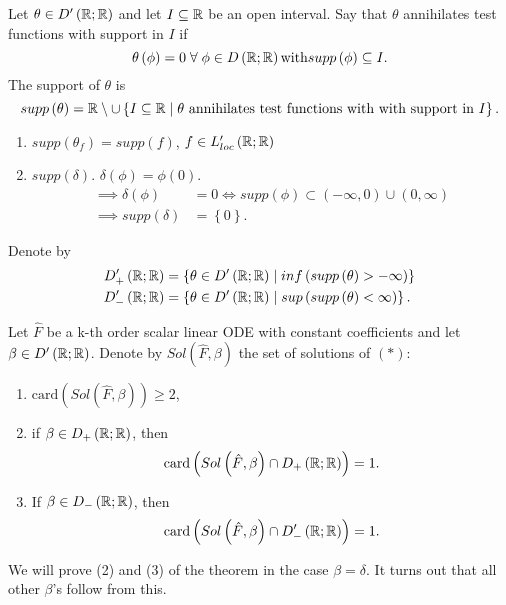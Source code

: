 \begin{definition}
	Let $\theta \in  D'\left( \mathbb{R}; \mathbb{R} \right) $ and let $I \subseteq \mathbb{R}$ be an open interval. Say that $\theta$ annihilates test functions with support in $I$ if 
	\[
		\theta\left( \phi \right) = 0 \forall  \phi \in  D \left(  \R; \R \right) \text{with} supp\left( \phi  \right) \subseteq I
	.\] 
	The support of $\theta$ is
	\[
		supp\left( \theta \right) = \mathbb{R} \setminus   \cup \left\{ I \subseteq \mathbb{R}  \mid \theta \text{ annihilates test functions with with support in }I  \right\} 
	.\] 
\end{definition} 
\begin{eg}
	\begin{enumerate}
		\item $supp\left( \theta_{f} \right)  = supp\left( f \right) $, $f \in  L'_{loc}\left(  \mathbb{R}; \mathbb{R} \right) $ 
		\item $supp\left( \delta \right) $. $\delta \left( \phi \right) = \phi \left( 0 \right) $.
			\begin{align*}
				\implies \delta \left( \phi \right) &= 0 \iff supp\left( \phi \right)  \subset \left( -\infty, 0  \right)  \cup \left( 0, \infty \right) \\
				\implies supp\left( \delta \right) &= \left\{ 0 \right\} 
			.\end{align*} 
	\end{enumerate}
\end{eg}
Denote by
\begin{align*}
	D'_{+}\left( \mathbb{R}; \mathbb{R} \right) &= \left\{ \theta \in  D'\left( \mathbb{R}; \mathbb{R} \right)  \mid  inf\left( supp\left( \theta \right) > -\infty \right)  \right\} \\
	D'_{-}\left( \mathbb{R}; \mathbb{R} \right) &= \left\{ \theta \in  D'\left( \mathbb{R}; \mathbb{R} \right)  \mid  sup\left( supp\left( \theta \right) < \infty \right)  \right\}
.\end{align*}

\begin{theorem}
	Let $\hat{F}$ be a k-th order scalar linear ODE with constant coefficients and let $\beta \in  D'\left( \mathbb{R}; \mathbb{R} \right) $. Denote by $Sol\left( \hat{F}, \beta \right) $ the set of solutions of $\left( * \right) $:
	\begin{enumerate}
		\item $\text{card}\left( Sol\left( \hat{F}, \beta \right)  \right) \ge 2$, 
		\item if $\beta \in D_{+}\left( \mathbb{R}; \mathbb{R} \right) $, then 
			\[
				\text{card}\left( Sol\left( \hat{F}, \beta \right) \cap D_{+}\left( \mathbb{R}; \mathbb{R} \right)  \right)  = 1
			.\] 
		\item If $\beta \in  D_{-}\left( \mathbb{R}; \mathbb{R} \right) $, then
			\[
				\text{card}\left( Sol\left( \hat{F}, \beta \right) \cap D'_{-}\left( \mathbb{R}; \mathbb{R} \right)  \right) = 1
			.\] 
	\end{enumerate}
	We will prove (2) and (3) of the theorem in the case $\beta = \delta$. It turns out that all other $\beta$'s follow from this.
\end{theorem}
